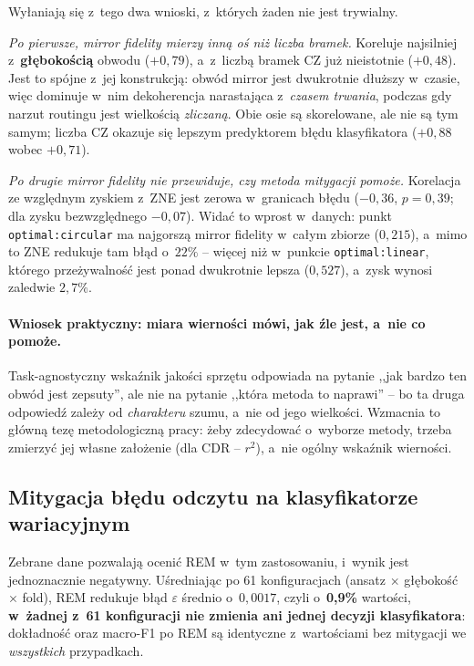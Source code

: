 \documentclass[11pt]{article}
\begin{document}
Wyłaniają się z~tego dwa wnioski, z~których żaden nie jest trywialny.

\emph{Po pierwsze, mirror fidelity mierzy inną oś niż liczba bramek.} Koreluje najsilniej
z~\textbf{głębokością} obwodu ($+0{,}79$), a~z~liczbą bramek CZ już nieistotnie ($+0{,}48$). Jest to
spójne z~jej konstrukcją: obwód mirror jest dwukrotnie dłuższy w~czasie, więc dominuje w~nim
dekoherencja narastająca z~\emph{czasem trwania}, podczas gdy narzut routingu jest wielkością
\emph{zliczaną}. Obie osie są skorelowane, ale nie są tym samym; liczba CZ okazuje się
lepszym predyktorem błędu klasyfikatora ($+0{,}88$ wobec $+0{,}71$).

\emph{Po drugie mirror fidelity nie przewiduje, czy metoda mitygacji pomoże.}
Korelacja ze względnym zyskiem z~ZNE jest zerowa w~granicach błędu ($-0{,}36$, $p=0{,}39$; dla zysku
bezwzględnego $-0{,}07$). Widać to wprost w~danych: punkt \texttt{optimal:circular} ma najgorszą
mirror fidelity w~całym zbiorze ($0{,}215$), a~mimo to ZNE redukuje tam błąd o~$22\%$ --
więcej niż w~punkcie \texttt{optimal:linear}, którego przeżywalność jest ponad dwukrotnie lepsza
($0{,}527$), a~zysk wynosi zaledwie $2{,}7\%$.

\paragraph{Wniosek praktyczny: miara wierności mówi, jak źle jest, a~nie co pomoże.} Task-agnostyczny
wskaźnik jakości sprzętu odpowiada na pytanie ,,jak bardzo ten obwód jest zepsuty'', ale nie na
pytanie ,,która metoda to naprawi'' -- bo ta druga odpowiedź zależy od \emph{charakteru} szumu,
a~nie od jego wielkości. Wzmacnia to główną tezę metodologiczną pracy: żeby zdecydować o~wyborze
metody, trzeba zmierzyć jej własne założenie (dla CDR -- $r^2$), a~nie ogólny wskaźnik wierności.

\subsection{Mitygacja błędu odczytu na klasyfikatorze wariacyjnym}\label{sec:rem-wynik}

Zebrane dane pozwalają ocenić REM w~tym zastosowaniu, i~wynik jest jednoznacznie negatywny.
Uśredniając po 61 konfiguracjach (ansatz $\times$ głębokość $\times$ fold), REM redukuje
błąd $\varepsilon$ średnio o~$0{,}0017$, czyli o~\textbf{0{,}9\%} wartości,
\textbf{w~żadnej z~61 konfiguracji nie zmienia ani jednej decyzji klasyfikatora}: dokładność oraz
macro-F1 po REM są identyczne z~wartościami bez mitygacji we \emph{wszystkich} przypadkach.
\end{document}
